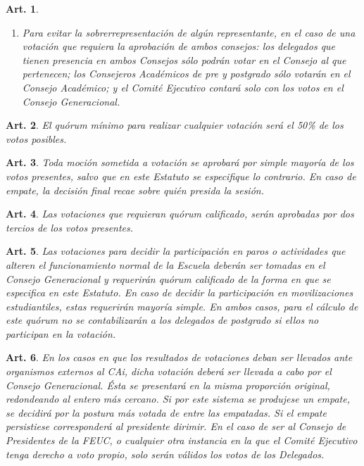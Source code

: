 \documentclass[letterpaper,11pt]{article}
\theoremstyle{plain}
\newtheorem{art}{Art.} %
\begin{document}
\begin{art}
\begin{enumerate}
\begin{itemize}
							\item El Representante de College tendrá un voto.
							\item El Subconsejero Académico tendrá un voto en caso que el Jefe de Docencia no esté presente.
						\end{itemize}
					\item Para evitar la sobrerrepresentación de algún representante, en el caso de una votación que requiera la aprobación de ambos consejos: los delegados que tienen presencia en ambos Consejos sólo podrán votar en el Consejo al que pertenecen; los Consejeros Académicos de pre y postgrado sólo votarán en el Consejo Académico; y el Comité Ejecutivo contará solo con los votos en el Consejo Generacional.
				\end{enumerate}
			\end{art}

			\begin{art}\label{quorumMinimoVotacion}
				El quórum mínimo para realizar cualquier votación será el 50\% de los votos posibles.
			\end{art}

			\begin{art}\label{esquemaVotacion}
				Toda moción sometida a votación se aprobará por simple mayoría de los votos presentes, salvo que en este Estatuto se especifique lo contrario. En caso de empate, la decisión final recae sobre quién presida la sesión.
			\end{art}

			\begin{art}\label{quorumCalificado}
				Las votaciones que requieran quórum calificado, serán aprobadas por dos tercios de los votos presentes.
			\end{art}

			\begin{art}\label{votacionMovilizacionParo}
				Las votaciones para decidir la participación en paros o actividades que alteren el funcionamiento normal de la Escuela deberán ser tomadas en el Consejo Generacional y requerirán quórum calificado de la forma en que se especifica en este Estatuto. En caso de decidir la participación en movilizaciones estudiantiles, estas requerirán mayoría simple. En ambos casos, para el cálculo de este quórum no se contabilizarán a los delegados de postgrado si ellos no participan en la votación.  
			\end{art}

			\begin{art}\label{votacionExterna}
				En los casos en que los resultados de votaciones deban ser llevados ante organismos externos al CAi, dicha votación deberá ser llevada a cabo por el Consejo Generacional. Ésta se presentará en la misma proporción original, redondeando al entero más cercano. Si por este sistema se produjese un empate, se decidirá por la postura más votada de entre las empatadas. Si el empate persistiese corresponderá al presidente dirimir. En el caso de ser al Consejo de Presidentes de la FEUC, o cualquier otra instancia en la que el Comité Ejecutivo tenga derecho a voto propio, solo serán válidos los votos de los Delegados.
			\end{art}
\end{document}
